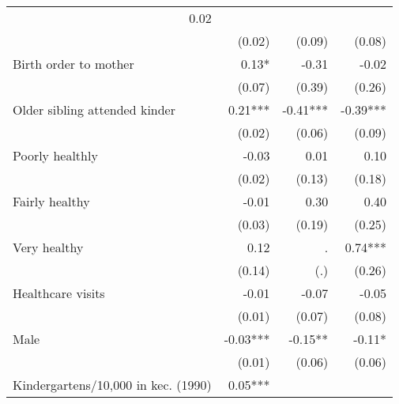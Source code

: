 \begin{tabular}{llll}
  \multicolumn{1}{r}{0.02 } \\
\multicolumn{1}{l}{} &
  \multicolumn{1}{r}{(0.02)} &
  \multicolumn{1}{r}{(0.09)} &
  \multicolumn{1}{r}{(0.08)} \\
\multicolumn{1}{l}{Birth order to mother} &
  \multicolumn{1}{r}{0.13* } &
  \multicolumn{1}{r}{-0.31 } &
  \multicolumn{1}{r}{-0.02 } \\
\multicolumn{1}{l}{} &
  \multicolumn{1}{r}{(0.07)} &
  \multicolumn{1}{r}{(0.39)} &
  \multicolumn{1}{r}{(0.26)} \\
\multicolumn{1}{l}{Older sibling attended kinder} &
  \multicolumn{1}{r}{0.21***} &
  \multicolumn{1}{r}{-0.41***} &
  \multicolumn{1}{r}{-0.39***} \\
\multicolumn{1}{l}{} &
  \multicolumn{1}{r}{(0.02)} &
  \multicolumn{1}{r}{(0.06)} &
  \multicolumn{1}{r}{(0.09)} \\
\multicolumn{1}{l}{Poorly healthly} &
  \multicolumn{1}{r}{-0.03 } &
  \multicolumn{1}{r}{0.01 } &
  \multicolumn{1}{r}{0.10 } \\
\multicolumn{1}{l}{} &
  \multicolumn{1}{r}{(0.02)} &
  \multicolumn{1}{r}{(0.13)} &
  \multicolumn{1}{r}{(0.18)} \\
\multicolumn{1}{l}{Fairly healthy} &
  \multicolumn{1}{r}{-0.01 } &
  \multicolumn{1}{r}{0.30 } &
  \multicolumn{1}{r}{0.40 } \\
\multicolumn{1}{l}{} &
  \multicolumn{1}{r}{(0.03)} &
  \multicolumn{1}{r}{(0.19)} &
  \multicolumn{1}{r}{(0.25)} \\
\multicolumn{1}{l}{Very healthy} &
  \multicolumn{1}{r}{0.12 } &
  \multicolumn{1}{r}{.} &
  \multicolumn{1}{r}{0.74***} \\
\multicolumn{1}{l}{} &
  \multicolumn{1}{r}{(0.14)} &
  \multicolumn{1}{r}{(.)} &
  \multicolumn{1}{r}{(0.26)} \\
\multicolumn{1}{l}{Healthcare visits} &
  \multicolumn{1}{r}{-0.01 } &
  \multicolumn{1}{r}{-0.07 } &
  \multicolumn{1}{r}{-0.05 } \\
\multicolumn{1}{l}{} &
  \multicolumn{1}{r}{(0.01)} &
  \multicolumn{1}{r}{(0.07)} &
  \multicolumn{1}{r}{(0.08)} \\
\multicolumn{1}{l}{Male} &
  \multicolumn{1}{r}{-0.03***} &
  \multicolumn{1}{r}{-0.15** } &
  \multicolumn{1}{r}{-0.11* } \\
\multicolumn{1}{l}{} &
  \multicolumn{1}{r}{(0.01)} &
  \multicolumn{1}{r}{(0.06)} &
  \multicolumn{1}{r}{(0.06)} \\
\multicolumn{1}{l}{Kindergartens/10,000 in kec. (1990)} &
  \multicolumn{1}{r}{0.05***} &

\end{tabular}
